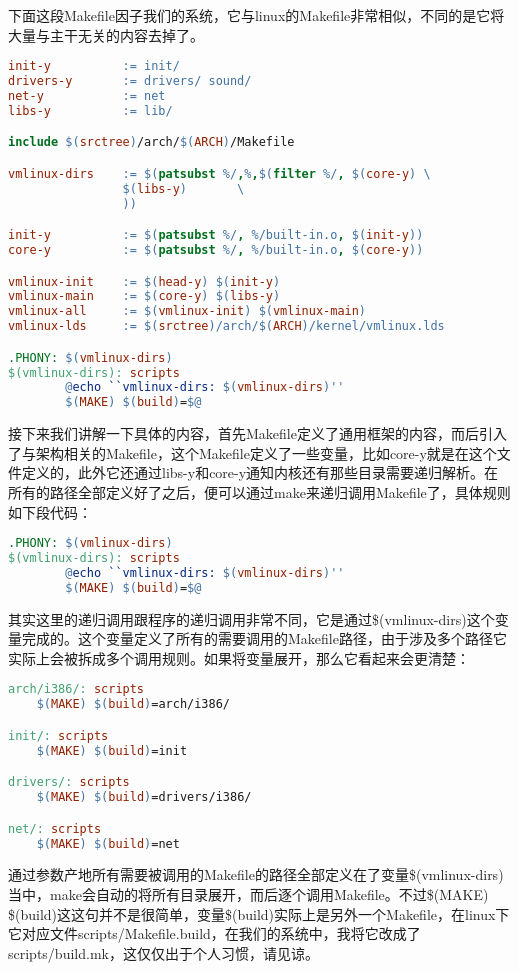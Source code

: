 下面这段Makefile因子我们的系统，它与linux的Makefile非常相似，不同的是它将大量与主干无关的内容去掉了。
\begin{lstlisting}[language=make]
init-y          := init/
drivers-y       := drivers/ sound/
net-y           := net
libs-y          := lib/

include $(srctree)/arch/$(ARCH)/Makefile

vmlinux-dirs    := $(patsubst %/,%,$(filter %/, $(core-y) \
                $(libs-y)       \
                ))

init-y          := $(patsubst %/, %/built-in.o, $(init-y))
core-y          := $(patsubst %/, %/built-in.o, $(core-y))

vmlinux-init    := $(head-y) $(init-y)
vmlinux-main    := $(core-y) $(libs-y)
vmlinux-all     := $(vmlinux-init) $(vmlinux-main)
vmlinux-lds     := $(srctree)/arch/$(ARCH)/kernel/vmlinux.lds

.PHONY: $(vmlinux-dirs)
$(vmlinux-dirs): scripts
        @echo ``vmlinux-dirs: $(vmlinux-dirs)''
        $(MAKE) $(build)=$@
\end{lstlisting}
接下来我们讲解一下具体的内容，首先Makefile定义了通用框架的内容，而后引入了与架构相关的Makefile，这个Makefile定义了一些变量，比如core-y就是在这个文件定义的，此外它还通过libs-y和core-y通知内核还有那些目录需要递归解析。在所有的路径全部定义好了之后，便可以通过make来递归调用Makefile了，具体规则如下段代码：
\begin{lstlisting}[language=make]
.PHONY: $(vmlinux-dirs)
$(vmlinux-dirs): scripts
        @echo ``vmlinux-dirs: $(vmlinux-dirs)''
        $(MAKE) $(build)=$@
\end{lstlisting}
其实这里的递归调用跟程序的递归调用非常不同，它是通过\$(vmlinux-dirs)这个变量完成的。这个变量定义了所有的需要调用的Makefile路径，由于涉及多个路径它实际上会被拆成多个调用规则。如果将变量展开，那么它看起来会更清楚：

\begin{lstlisting}[language=make]
arch/i386/: scripts
    $(MAKE) $(build)=arch/i386/

init/: scripts
    $(MAKE) $(build)=init

drivers/: scripts
    $(MAKE) $(build)=drivers/i386/

net/: scripts
    $(MAKE) $(build)=net

\end{lstlisting}

通过参数产地所有需要被调用的Makefile的路径全部定义在了变量\$(vmlinux-dirs)当中，make会自动的将所有目录展开，而后逐个调用Makefile。不过\$(MAKE) \$(build)这这句并不是很简单，变量\$(build)实际上是另外一个Makefile，在linux下它对应文件scripts/Makefile.build，在我们的系统中，我将它改成了scripts/build.mk，这仅仅出于个人习惯，请见谅。

